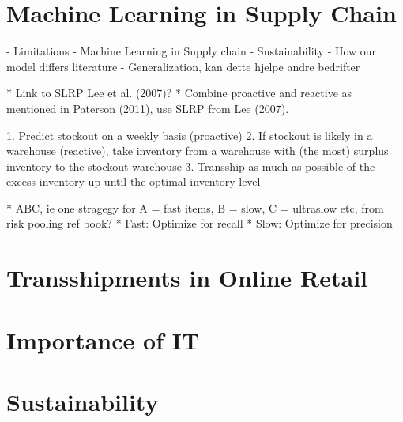 \documentclass[../../main.tex]{subfiles}
\begin{document}

\section{Machine Learning in Supply Chain}


- Limitations
- Machine Learning in Supply chain
- Sustainability
- How our model differs literature
- Generalization, kan dette hjelpe andre bedrifter

* Link to SLRP Lee et al. (2007)?
  * Combine proactive and reactive as mentioned in Paterson (2011), use SLRP from Lee (2007).

1.	Predict stockout on a weekly basis (proactive)
2.	If stockout is likely in a warehouse (reactive), take inventory from a warehouse with (the most) surplus inventory to the stockout warehouse
3.	Transship as much as possible of the excess inventory up until the optimal inventory level

*	ABC, ie one stragegy for A = fast items, B = slow, C = ultraslow etc, from risk pooling ref book? 
  * Fast: Optimize for recall
  * Slow: Optimize for precision

\section{Transshipments in Online Retail}
\section{Importance of IT}
\section{Sustainability}

\end{document}

